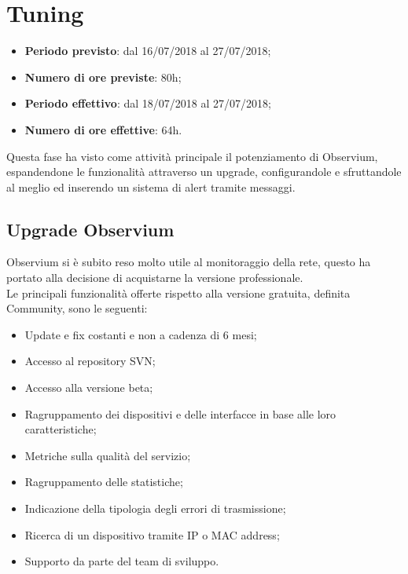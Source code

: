 \documentclass[Realizzazione.tex]{subfiles}
\begin{document}
\section{Tuning}
\begin{itemize}
	\item \textbf{Periodo previsto}: dal 16/07/2018 al 27/07/2018;
	\item \textbf{Numero di ore previste}: 80h;
	\item \textbf{Periodo effettivo}: dal 18/07/2018 al 27/07/2018;
	\item \textbf{Numero di ore effettive}: 64h.
\end{itemize}
Questa fase ha visto come attività principale il potenziamento di Observium, espandendone le funzionalità attraverso un upgrade, configurandole e sfruttandole al meglio ed inserendo un sistema di alert tramite messaggi.

\subsection{Upgrade Observium}
Observium si è subito reso molto utile al monitoraggio della rete, questo ha portato alla decisione di acquistarne la versione professionale. \\
Le principali funzionalità offerte rispetto alla versione gratuita, definita Community, sono le seguenti:
\begin{itemize}
	\item Update e fix costanti e non a cadenza di 6 mesi;
	\item Accesso al repository SVN;
	\item Accesso alla versione beta;
	\item Ragruppamento dei dispositivi e delle interfacce in base alle loro caratteristiche;
	\item Metriche sulla qualità del servizio;
	\item Ragruppamento delle statistiche;
	\item Indicazione della tipologia degli errori di trasmissione;
	\item Ricerca di un dispositivo tramite IP o MAC address;
	\item Supporto da parte del team di sviluppo.
\end{itemize}
\end{document}
